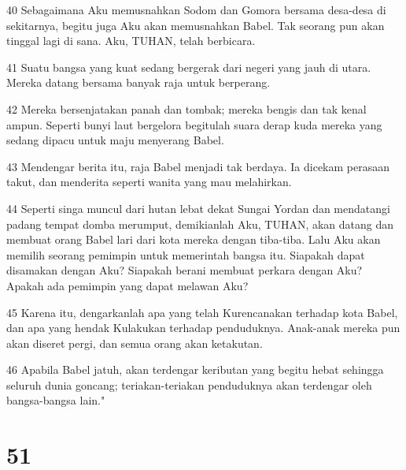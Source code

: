 \par 40 Sebagaimana Aku memusnahkan Sodom dan Gomora bersama desa-desa di sekitarnya, begitu juga Aku akan memusnahkan Babel. Tak seorang pun akan tinggal lagi di sana. Aku, TUHAN, telah berbicara.
\par 41 Suatu bangsa yang kuat sedang bergerak dari negeri yang jauh di utara. Mereka datang bersama banyak raja untuk berperang.
\par 42 Mereka bersenjatakan panah dan tombak; mereka bengis dan tak kenal ampun. Seperti bunyi laut bergelora begitulah suara derap kuda mereka yang sedang dipacu untuk maju menyerang Babel.
\par 43 Mendengar berita itu, raja Babel menjadi tak berdaya. Ia dicekam perasaan takut, dan menderita seperti wanita yang mau melahirkan.
\par 44 Seperti singa muncul dari hutan lebat dekat Sungai Yordan dan mendatangi padang tempat domba merumput, demikianlah Aku, TUHAN, akan datang dan membuat orang Babel lari dari kota mereka dengan tiba-tiba. Lalu Aku akan memilih seorang pemimpin untuk memerintah bangsa itu. Siapakah dapat disamakan dengan Aku? Siapakah berani membuat perkara dengan Aku? Apakah ada pemimpin yang dapat melawan Aku?
\par 45 Karena itu, dengarkanlah apa yang telah Kurencanakan terhadap kota Babel, dan apa yang hendak Kulakukan terhadap penduduknya. Anak-anak mereka pun akan diseret pergi, dan semua orang akan ketakutan.
\par 46 Apabila Babel jatuh, akan terdengar keributan yang begitu hebat sehingga seluruh dunia goncang; teriakan-teriakan penduduknya akan terdengar oleh bangsa-bangsa lain."

\chapter{51}

